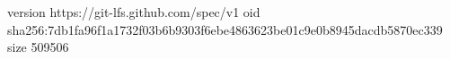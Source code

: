 version https://git-lfs.github.com/spec/v1
oid sha256:7db1fa96f1a1732f03b6b9303f6ebe4863623be01c9e0b8945dacdb5870ec339
size 509506
